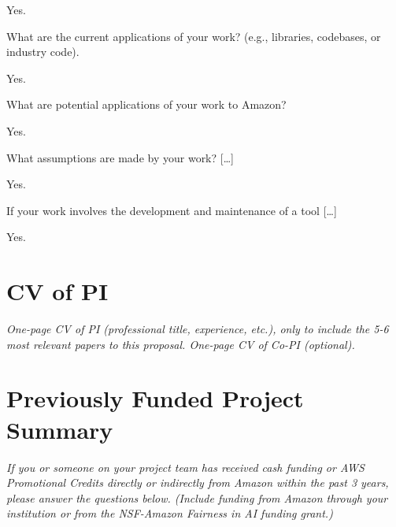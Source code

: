\documentclass[titlesec]{araproposal}
\begin{document}
\begin{answer}%
  Yes.
\end{answer}

\begin{question}
  What are the current applications of your work? (e.g., libraries, codebases, or industry code).
\end{question}

\begin{answer}%
  Yes.
\end{answer}

\begin{question}%
  What are potential applications of your work to Amazon?
\end{question}

\begin{answer}%
  Yes.
\end{answer}

\begin{question}
  What assumptions are made by your work? [\dots] %
\end{question}

\begin{answer}%
  Yes.
\end{answer}

\begin{question}
  If your work involves the development and maintenance of a tool [\dots]
\end{question}

\begin{answer}%
  Yes.
\end{answer}

\appendix

\newpage
 
 

\newpage
\section{CV of PI}
\textit{One-page CV of PI (professional title, experience, etc.), only to include the 5-6 most relevant papers to this proposal. One-page CV of Co-PI (optional).}

\newpage
\section{Previously Funded Project Summary}
\textit{If you or someone on your project team has received cash funding or AWS Promotional Credits directly or indirectly from Amazon within the past 3 years, please answer the questions below. (Include funding from Amazon through your institution or from the NSF-Amazon Fairness in AI funding grant.)}
\end{document}
